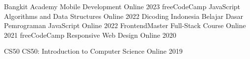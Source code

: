 

\begin{cvhonors}
  \cvhonor
    {Bangkit Academy} %
    {Mobile Development} %
    {Online} %
    {2023} %
  \cvhonor
    {freeCodeCamp} %
    {JavaScript Algorithms and Data Structures} %
    {Online} %
    {2022} %
  \cvhonor
    {Dicoding Indonesia} %
    {Belajar Dasar Pemrograman JavaScript} %
    {Online} %
    {2022} %
  \cvhonor
    {FrontendMaster} %
    {Full-Stack Course} %
    {Online} %
    {2021} %
  \cvhonor
    {freeCodeCamp} %
    {Responsive Web Design} %
    {Online} %
    {2020} %


  \cvhonor
    {CS50} %
    {CS50: Introduction to Computer Science} %
    {Online} %
    {2019} %




\end{cvhonors}
